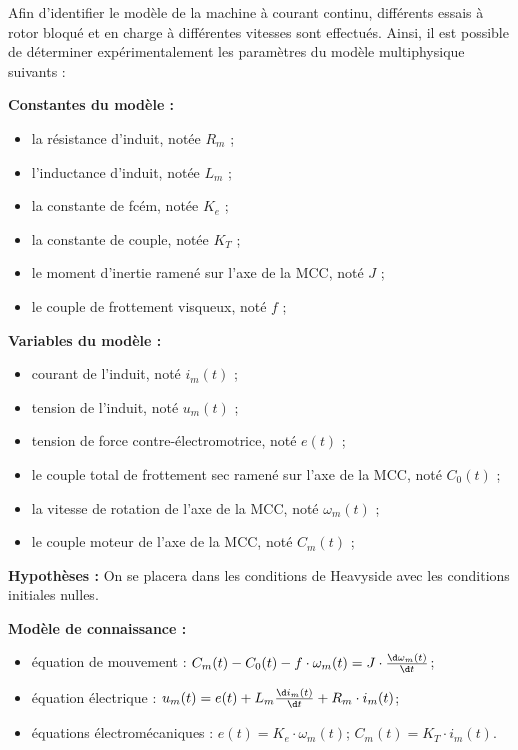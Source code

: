 Afin d'identifier le modèle de la machine à courant continu, différents
essais à rotor bloqué et en charge à différentes vitesses sont
effectués. Ainsi, il est possible de déterminer expérimentalement les
paramètres du modèle multiphysique suivants :

\begin{minipage}{0.5\textwidth}
\textbf{Constantes du modèle :}
\begin{itemize}
\item la résistance d'induit, notée $R_m$ ;
\item l'inductance d'induit, notée $L_m$ ;
\item la constante de fcém, notée $K_e$ ;
\item la constante de couple, notée $K_T$ ;
\item le moment d'inertie ramené sur l'axe de la MCC, noté $J$ ;
\item le couple de frottement visqueux, noté $f$ ;
\end{itemize}

\end{minipage}
\begin{minipage}{0.5\textwidth}
\textbf{Variables du modèle : }
\begin{itemize}
\item courant de l'induit, noté $i_m(t)$ ;
\item tension de l'induit, noté $u_m(t)$ ;
\item tension de force contre-électromotrice, noté $e(t)$ ;
\item le couple total de frottement sec ramené sur l'axe de la MCC, noté $C_0(t)$ ;
\item la vitesse de rotation de l'axe de la MCC, noté $\omega_m(t)$ ;
\item le couple moteur de l'axe de la MCC, noté $C_m(t)$ ;
\end{itemize}
\end{minipage}

\textbf{Hypothèses : } On se placera dans les conditions de Heavyside avec les conditions initiales nulles.

\textbf{Modèle de connaissance :}
\begin{itemize}
\item équation de mouvement : $C_m(t)-C_0(t)-f\cdot \omega_m(t)=J\cdot\frac{\d \omega_m(t)}{\d t}$;
\item équation électrique : $u_m(t)=e(t)+L_m\frac{\d i_m(t)}{\d t}+R_m\cdot i_m(t)$;
\item équations électromécaniques : $e(t)=K_e\cdot \omega_m(t)$; $C_m(t)=K_T\cdot i_m(t)$.
\end{itemize}


